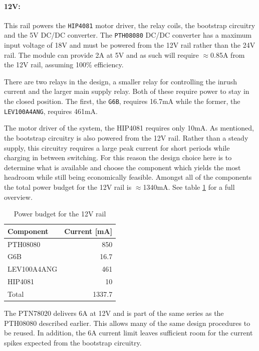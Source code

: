 \paragraph{12V:} %
\label{par:12v}
This rail powers the \texttt{HIP4081} motor driver, the relay coils, the bootstrap circuitry and the 5V DC/DC converter.
The \texttt{PTH08080} DC/DC converter has a maximum input voltage of 18V and must be powered from the 12V rail rather than the 24V rail.
The module can provide 2A at 5V and as such will require $\approx$0.85A from the 12V rail, assuming 100\% efficiency.

There are two relays in the design, a smaller relay for controlling the inrush current and the larger main supply relay.
Both of these require power to stay in the closed position.
The first, the \texttt{G6B}, requires 16.7mA while the former, the \texttt{LEV100A4ANG}, requires 461mA.

The motor driver of the system, the HIP4081 requires only 10mA.
As mentioned, the bootstrap circuitry is also powered from the 12V rail.
Rather than a steady supply, this circuitry requires a large peak current for short periods while charging in between switching.
For this reason the design choice here is to determine what is available and choose the component which yields the most headroom while still being economically feasible.
Amongst all of the components the total power budget for the 12V rail is $\approx$1340mA.
See table \ref{tab:12vpowerbudget} for a full overview.

\begin{table}
	\centering
	\begin{tabular}{l|r}
		 Component & Current [mA]\\
		 \hline
		 PTH08080 & 850\\
		 G6B & 16.7\\
		 LEV100A4ANG & 461\\
		 HIP4081 & 10\\
		 \hline
		 Total & 1337.7
	\end{tabular}
	\caption{Power budget for the 12V rail}
	\label{tab:12vpowerbudget}
\end{table}

The PTN78020 delivers 6A at 12V and is part of the same series as the PTH08080 described earlier.
This allows many of the same design procedures to be reused.
In addition, the 6A current limit leaves sufficient room for the current spikes expected from the bootstrap circuitry.

